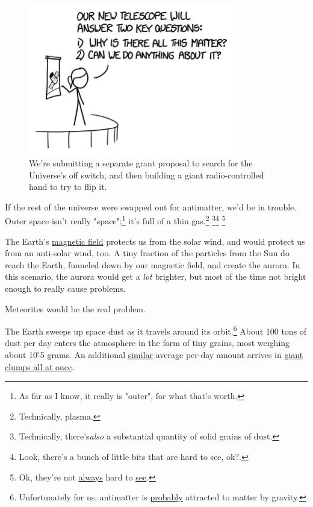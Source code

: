 {\begin{figure}[!htbp]
\centering
\includegraphics[scale=0.5, max width=0.8\textwidth]{imgs/a/114/questions.png}
\caption{We're submitting a separate grant proposal to search for the Universe's off switch, and then building a giant radio-controlled hand to try to flip it.}
\end{figure}

{If the rest of the universe were swapped out for antimatter, we'd be in trouble. Outer space isn't really "space";{\footnote{As far as I know, it really is "outer", for what that's worth.} } it's full of a thin gas.{\footnote{Technically, plasma.} } ​{\footnote{Technically, there's\emph{also} a substantial quantity of solid grains of dust.} } ​{\footnote{Look, there's a bunch of little bits that are hard to see, ok?.} } ​{\footnote{Ok, they're not \href{https://www.flickr.com/groups/northernlight/}{always} hard to \href{https://www.google.com/search?q=1833+leonids&tbm=isch} {see}.} } }

{The Earth's \href{http://en.wikipedia.org/wiki/The\_Magnetic\_Fields}{magnetic field} protects us from the solar wind, and would protect us from an anti-solar wind, too. A tiny fraction of the particles from the Sun do reach the Earth, funneled down by our magnetic field, and create the aurora. In this scenario, the aurora would get a \emph{lot} brighter, but most of the time not bright enough to really cause problems.}

{Meteorites would be the real problem.}

{The Earth sweeps up space dust as it travels around its orbit.{\footnote{Unfortunately for us, antimatter is \href{http://en.wikipedia.org/wiki/Gravitational\_interaction\_of\_antimatter}{probably} attracted to matter by gravity.} } About 100 tons of dust per day enters the atmosphere in the form of tiny grains, most weighing about 10\^-5 grams. An additional \href{http://books.google.com/books?id=eqd4e34uE-MC&pg=PA78}{similar} average per-day amount arrives in \href{http://en.wikipedia.org/wiki/Chicxulub\_impactor} {giant clumps all at once}.}

}
